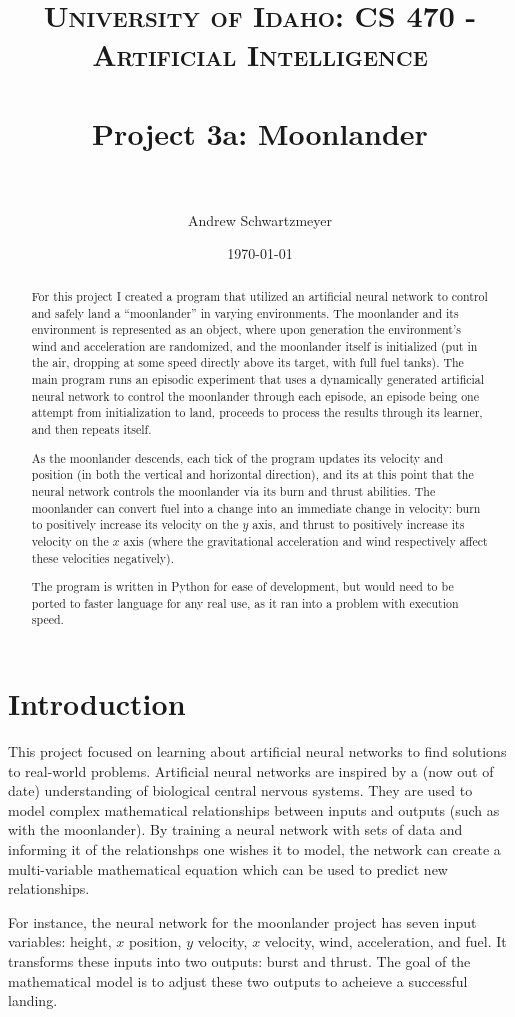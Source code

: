 \documentclass[12pt, article]{scrartcl}
\title{	
\normalfont \normalsize 
\textsc{University of Idaho: CS 470 - Artificial Intelligence} \\ [25pt]
\horrule{0.5pt} \\[0.4cm]
\huge Project 3a: Moonlander\\
\horrule{2pt} \\[0.5cm]
}
\author{Andrew Schwartzmeyer}
\date{\normalsize\today}
\begin{document}
\maketitle 
\begin{abstract}
For this project I created a program that utilized an artificial neural network to control and safely land a ``moonlander'' in varying environments. The moonlander and its environment is represented as an object, where upon generation the environment's wind and acceleration are randomized, and the moonlander itself is initialized (put in the air, dropping at some speed directly above its target, with full fuel tanks). The main program runs an episodic experiment that uses a dynamically generated artificial neural network to control the moonlander through each episode, an episode being one attempt from initialization to land, proceeds to process the results through its learner, and then repeats itself.

As the moonlander descends, each tick of the program updates its velocity and position (in both the vertical and horizontal direction), and its at this point that the neural network controls the moonlander via its burn and thrust abilities. The moonlander can convert fuel into a change into an immediate change in velocity: burn to positively increase its velocity on the $y$ axis, and thrust to positively increase its velocity on the $x$ axis (where the gravitational acceleration and wind respectively affect these velocities negatively).

The program is written in Python for ease of development, but would need to be ported to faster language for any real use, as it ran into a problem with execution speed.
\end{abstract}
\pagebreak
\section{Introduction}
This project focused on learning about artificial neural networks to find solutions to real-world problems. Artificial neural networks are inspired by a (now out of date) understanding of biological central nervous systems. They are used to model complex mathematical relationships between inputs and outputs (such as with the moonlander). By training a neural network with sets of data and informing it of the relationshps one wishes it to model, the network can create a multi-variable mathematical equation which can be used to predict new relationships.

For instance, the neural network for the moonlander project has seven input variables: height, $x$ position, $y$ velocity, $x$ velocity, wind, acceleration, and fuel. It transforms these inputs into two outputs: burst and thrust. The goal of the mathematical model is to adjust these two outputs to acheieve a successful landing.
\end{document}

